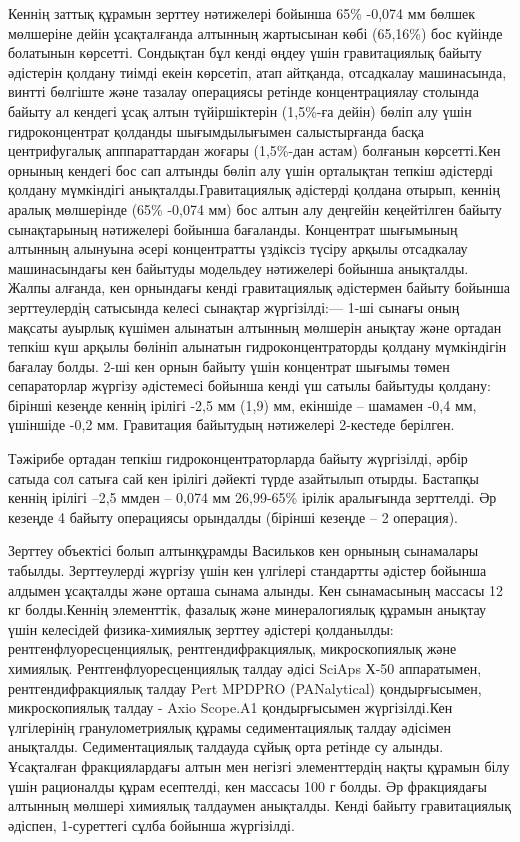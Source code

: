 Кеннің заттық құрамын зерттеу нәтижелері бойынша 65\% -0,074 мм бөлшек
мөлшеріне дейін ұсақталғанда алтынның жартысынан көбі (65,16\%) бос
күйінде болатынын көрсетті. Сондықтан бұл кенді өңдеу үшін гравитациялық
байыту әдістерін қолдану тиімді екеін көрсетіп, атап айтқанда,
отсадкалау машинасында, винтті бөлгіште және тазалау операциясы ретінде
концентрациялау столында байыту ал кендегі ұсақ алтын түйіршіктерін
(1,5\%-ға дейін) бөліп алу үшін гидроконцентрат қолданды шығымдылығымен
салыстырғанда басқа центрифугалық апппараттардан жоғары (1,5\%-дан
астам) болғанын көрсетті.Кен орнының кендегі бос сап алтынды бөліп алу
үшін орталықтан тепкіш әдістерді қолдану мүмкіндігі
анықталды.Гравитациялық әдістерді қолдана отырып, кеннің аралық
мөлшерінде (65\% -0,074 мм) бос алтын алу деңгейін кеңейтілген байыту
сынақтарының нәтижелері бойынша бағаланды. Концентрат шығымының алтынның
алынуына әсері концентратты үздіксіз түсіру арқылы отсадкалау
машинасындағы кен байытуды модельдеу нәтижелері бойынша анықталды. Жалпы
алғанда, кен орнындағы кенді гравитациялық әдістермен байыту бойынша
зерттеулердің сатысында келесі сынақтар жүргізілді:--- 1-ші сынағы оның
мақсаты ауырлық күшімен алынатын алтынның мөлшерін анықтау және ортадан
тепкіш күш арқылы бөлініп алынатын гидроконцентраторды қолдану
мүмкіндігін бағалау болды. 2-ші кен орнын байыту үшін концентрат шығымы
төмен сепараторлар жүргізу әдістемесі бойынша кенді үш сатылы байытуды
қолдану: бірінші кезеңде кеннің ірілігі -2,5 мм (1,9) мм, екіншіде --
шамамен -0,4 мм, үшіншіде -0,2 мм. Гравитация байытудың нәтижелері
2-кестеде берілген.

Тәжірибе ортадан тепкіш гидроконцентраторларда байыту жүргізілді, әрбір
сатыда сол сатыға сай кен ірілігі дәйекті түрде азайтылып отырды.
Бастапқы кеннің ірілігі --2,5 ммден -- 0,074 мм 26,99-65\% ірілік
аралығында зерттелді. Әр кезеңде 4 байыту операциясы орындалды (бірінші
кезеңде -- 2 операция).

Зерттеу объектісі болып алтынқұрамды Васильков кен орнының сынамалары
табылды. Зерттеулерді жүргізу үшін кен үлгілері стандартты әдістер
бойынша алдымен ұсақталды және орташа сынама алынды. Кен сынамасының
массасы 12 кг болды.Кеннің элементтік, фазалық және минералогиялық
құрамын анықтау үшін келесідей физика-химиялық зерттеу әдістері
қолданылды: рентгенфлуоресценциялық, рентгендифракциялық, микроскопиялық
және химиялық. Рентгенфлуоресценциялық талдау әдісі SciAps Х-50
аппаратымен, рентгендифракциялық талдау Pert MPDPRO (PANalytical)
қондырғысымен, микроскопиялық талдау - Axio Scope.A1 қондырғысымен
жүргізілді.Кен үлгілерінің гранулометриялық құрамы седиментациялық
талдау әдісімен анықталды. Седиментациялық талдауда сұйық орта ретінде
су алынды. Ұсақталған фракциялардағы алтын мен негізгі элементтердің
нақты құрамын білу үшін рационалды құрам есептелді, кен массасы 100 г
болды. Әр фракциядағы алтынның мөлшері химиялық талдаумен анықталды.
Кенді байыту гравитациялық әдіспен, 1-суреттегі сұлба бойынша
жүргізілді.

